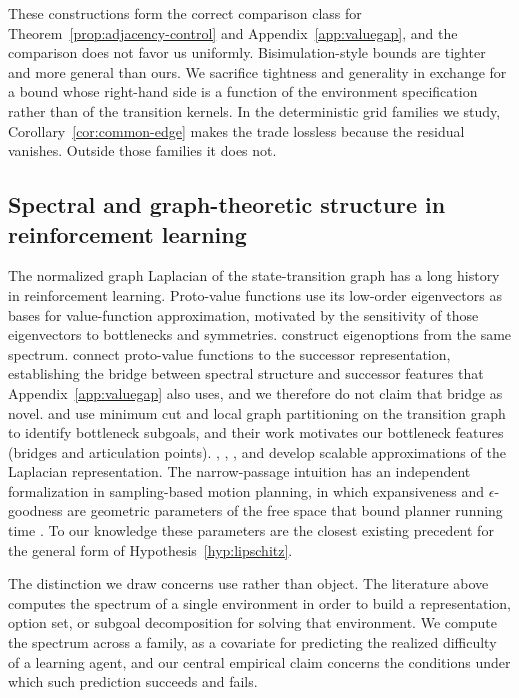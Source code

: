 \documentclass[twoside]{article}
\begin{document}
These constructions form the correct comparison class for Theorem~\ref{prop:adjacency-control} and Appendix~\ref{app:valuegap}, and the comparison does not favor us uniformly. Bisimulation-style bounds are tighter and more general than ours. We sacrifice tightness and generality in exchange for a bound whose right-hand side is a function of the environment specification rather than of the transition kernels. In the deterministic grid families we study, Corollary~\ref{cor:common-edge} makes the trade lossless because the residual vanishes. Outside those families it does not.

\subsection{Spectral and graph-theoretic structure in reinforcement learning}

The normalized graph Laplacian of the state-transition graph has a long history in reinforcement learning. Proto-value functions \citep{mahadevan2005proto, mahadevan2007proto} use its low-order eigenvectors as bases for value-function approximation, motivated by the sensitivity of those eigenvectors to bottlenecks and symmetries. \citet{machado2017laplacian} construct eigenoptions from the same spectrum. \citet{machado2018eigenoption} connect proto-value functions to the successor representation, establishing the bridge between spectral structure and successor features that Appendix~\ref{app:valuegap} also uses, and we therefore do not claim that bridge as novel. \citet{menache2002qcut} and \citet{simsek2005identifying} use minimum cut and local graph partitioning on the transition graph to identify bottleneck subgoals, and their work motivates our bottleneck features (bridges and articulation points). \citet{jinnai2019discovering}, \citet{wu2019laplacian}, \citet{wang2021towards}, and \citet{klissarov2023deep} develop scalable approximations of the Laplacian representation. The narrow-passage intuition has an independent formalization in sampling-based motion planning, in which expansiveness and $\epsilon$-goodness are geometric parameters of the free space that bound planner running time \citep{hsu1997path, kavraki1998analysis}. To our knowledge these parameters are the closest existing precedent for the general form of Hypothesis~\ref{hyp:lipschitz}.

The distinction we draw concerns use rather than object. The literature above computes the spectrum of a single environment in order to build a representation, option set, or subgoal decomposition for solving that environment. We compute the spectrum across a family, as a covariate for predicting the realized difficulty of a learning agent, and our central empirical claim concerns the conditions under which such prediction succeeds and fails.
\end{document}
